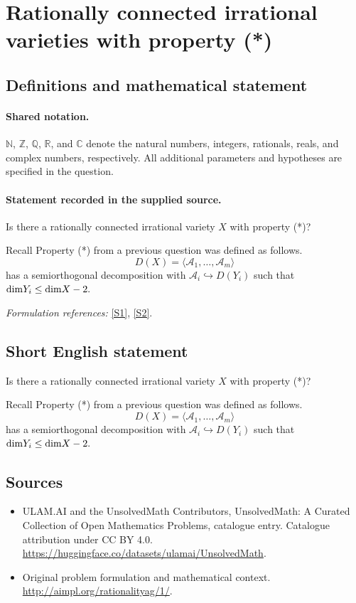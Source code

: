 \documentclass[11pt]{article}
\newcommand{\sref}[2]{\hyperlink{source:#1:#2}{[S#2]}}
\begin{document}
\section{Rationally connected irrational varieties with property (*)}\label{statement}

\subsection{Definitions and mathematical statement}

\paragraph{Shared notation.}$\mathbb N$, $\mathbb Z$, $\mathbb Q$, $\mathbb R$, and $\mathbb C$ denote the natural numbers, integers, rationals, reals, and complex numbers, respectively. All additional parameters and hypotheses are specified in the question.


\paragraph{Statement recorded in the supplied source.}
Is there a rationally connected irrational variety $X$ with property (*)?

Recall Property (*) from a previous question was defined as follows.
\[
D(X) = \langle \mathscr A_1, \ldots, \mathscr A_m \rangle
\]
has a semiorthogonal decomposition
with $\mathscr A_i \hookrightarrow D(Y_i)$ such that ${\rm dim} Y_i \leq {\rm dim}X-2.$
\par\smallskip\textit{Formulation references:} \sref{statement}{1}, \sref{statement}{2}.
\subsection{Short English statement}
Is there a rationally connected irrational variety $X$ with property (*)?

Recall Property (*) from a previous question was defined as follows.
\[
D(X) = \langle \mathscr A_1, \ldots, \mathscr A_m \rangle
\]
has a semiorthogonal decomposition
with $\mathscr A_i \hookrightarrow D(Y_i)$ such that ${\rm dim} Y_i \leq {\rm dim}X-2.$
\subsection{Sources}
\begin{itemize}
\item[\hypertarget{source:statement:1}{S1}] ULAM.AI and the UnsolvedMath Contributors, UnsolvedMath: A Curated Collection of Open Mathematics Problems, catalogue entry. Catalogue attribution under CC BY 4.0.
\url{https://huggingface.co/datasets/ulamai/UnsolvedMath}.
\item[\hypertarget{source:statement:2}{S2}] Original problem formulation and mathematical context.
\url{http://aimpl.org/rationalityag/1/}.
\end{itemize}
\label{end:statement}
\end{document}
